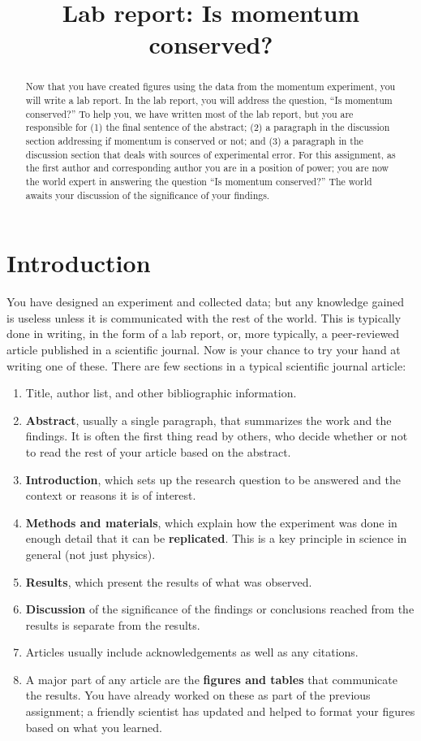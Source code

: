 \documentclass [hw,addpoints,noanswers]{exam}
\title{Lab report: Is momentum conserved? }
\author{\mobeardInstructorShort}
\date{\printdate{4/29/2021}}
\begin{document}
\maketitle

\begin{abstract}
Now that you have created figures using the data from the momentum experiment, you will write a lab report. In the lab report, you will address the question, ``Is momentum conserved?'' To help you, we have written most of the lab report, but you are responsible for (1) the final sentence of the abstract; (2) a paragraph in the discussion section addressing if momentum is conserved or not; and (3) a paragraph in the discussion section that deals with sources of experimental error.  For this assignment, as the first author and corresponding author you are in a position of power; you are now the world expert in answering the question ``Is momentum conserved?'' The world awaits your discussion of the significance of your findings. 
\end{abstract}

\section{Introduction}
You have designed an experiment and collected data; but any knowledge gained is useless unless it is communicated with the rest of the world. This is typically done in writing, in the form of a lab report, or, more typically, a peer-reviewed article published in a scientific journal. Now is your chance to try your hand at writing one of these.  There are few sections in a typical scientific journal article: 
\begin{enumerate}
\item Title, author list, and other bibliographic information. 
\item \textbf{Abstract}, usually a single paragraph, that summarizes the work and the findings. It is often the first thing read by others, who decide whether or not to read the rest of your article based on the abstract. 
\item \textbf{Introduction}, which sets up the research question to be answered and the context or reasons it is of interest. 
\item \textbf{Methods and materials}, which explain how the experiment was done in enough detail that it can be \textbf{replicated}. This is a key principle in science in general (not just physics).
\item \textbf{Results}, which present the results of what was observed. 
\item \textbf{Discussion} of the significance of the findings or conclusions reached from the results is separate from the results. 
\item Articles usually include acknowledgements as well as any citations. 
\item A major part of any article are the \textbf{figures and tables} that communicate the results. You have already worked on these as part of the previous assignment; a friendly scientist has updated and helped to format your figures based on what you learned. 
\end{enumerate}
\end{document}
